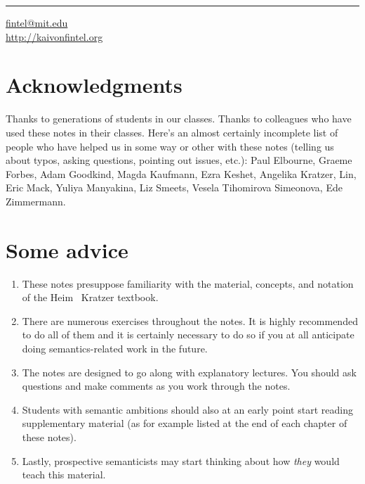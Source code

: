 \plainbreak{1}

\href{mailto:fintel@mit.edu}{fintel@mit.edu}\\
\url{http://kaivonfintel.org} 

\cleardoublepage

\null
\vfill \ba 

\section*{Acknowledgments}

Thanks to generations of students in our classes. Thanks to colleagues
who have used these notes in their classes. Here's an almost certainly
incomplete list of people who have helped us in some way or other with
these notes (telling us about typos, asking questions, pointing out
issues, etc.): Paul Elbourne, Graeme Forbes, Adam Goodkind, Magda
Kaufmann, Ezra Keshet, Angelika Kratzer, Lin, Eric Mack, Yuliya
Manyakina, Liz Smeets, Vesela Tihomirova Simeonova, Ede Zimmermann.

\section*{Some advice}
\begin{enumerate}
\item These notes presuppose familiarity with the material, concepts,
  and notation of the Heim \amp\ Kratzer textbook.
\item There are numerous exercises throughout the notes. It is highly
  recommended to do all of them and it is certainly necessary to do so
  if you at all anticipate doing semantics-related work in the future.
\item The notes are designed to go along with explanatory lectures.
  You should ask questions and make comments as you work through the
  notes.
\item Students with semantic ambitions should also at an early point
  start reading supplementary material (as for example listed at the
  end of each chapter of these notes).
\item Lastly, prospective semanticists may start thinking about how
  \emph{they} would teach this material.
\end{enumerate}

\ab 
\vfill\null

\newpage\hbox{}
\vfill{\scshape{}}
\vfill\hbox{}\thispagestyle{cleared}